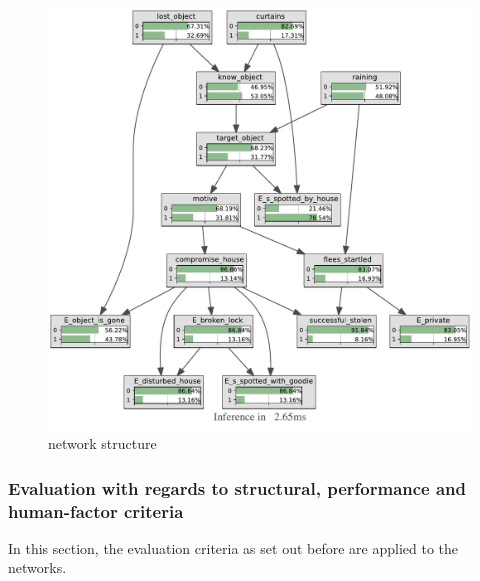 \begin{figure}[htbp]
\begin{center}
\includegraphics[width=\linewidth]{../experiments/StolenLaptop/bnImage/BNIMAGEStolenLaptop.pdf}
\end{center}
\caption{network structure}
\label{laptop}
\end{figure}


\subsubsection{Evaluation with regards to structural, performance and human-factor criteria}
In this section, the evaluation criteria as set out before are applied to the networks.

